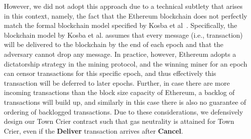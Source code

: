 However, we did not adopt this approach due to a technical subtlety
that arises in this context, namely, the fact that  
the Ethereum blockchain does not  
perfectly match the formal blockchain 
model specified by Kosba et al~\cite{hawk}.
Specifically, the blockchain model by Kosba et al.
assumes that every message (i.e., transaction) will be delivered 
to the blockchain 
by the end of each epoch and that the adversary cannot drop
any message.
In practice, however, 
Ethereum adopts a dictatorship 
strategy in the mining protocol, and the winning miner 
for an epoch can censor transactions for this specific epoch, and thus
effectively this transaction will be deferred to later epochs.
Further, in case there are more incoming transactions than the block size
capacity of Ethereum, a backlog of transactions will build up, 
and similarly in this case there is also no guarantee of 
ordering of backlogged transactions.
Due to these considerations, we defensively design our Town Crier contract
such that gas neutrality is attained for Town Crier,
even if the {\bf Deliver} transaction arrives after {\bf Cancel}.







